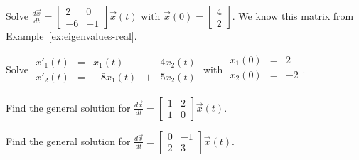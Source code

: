 \documentclass[../main.tex]{subfiles}
\begin{document}
\begin{example}
  Solve \( \frac{d\vec{x}}{dt} = \begin{bmatrix} 2   & 0  \\ -6 & -1 \end{bmatrix} \vec{x}(t) \) with \(\vec{x}(0) = \begin{bmatrix} 4 \\ 2 \end{bmatrix}\).
  We know this matrix from Example~\ref{ex:eigenvalues-real}.

\end{example}
\clearpage

\begin{example}
  Solve 
  \(
  \begin{array}{rcrcr}
    x'_{1}(t) &=&    x_{1}(t) &-& 4x_{2}(t) \\
    x'_{2}(t) &=& -8 x_{1}(t) &+& 5x_{2}(t)
  \end{array}
  \) with \(
  \begin{array}{rcr}
    x_{1}(0) &=&  2 \\
    x_{2}(0) &=& -2 \\
  \end{array}
  \).

\end{example}
\clearpage


\begin{example}
  Find the general solution for \( \frac{d\vec{x}}{dt} = \begin{bmatrix} 1 & 2  \\ 1 & 0 \end{bmatrix} \vec{x}(t) \).

\end{example}

\begin{example}
  Find the general solution for \( \frac{d\vec{x}}{dt} = \begin{bmatrix} 0 & -1  \\ 2 & 3 \end{bmatrix} \vec{x}(t) \).

\end{example}
\end{document}
